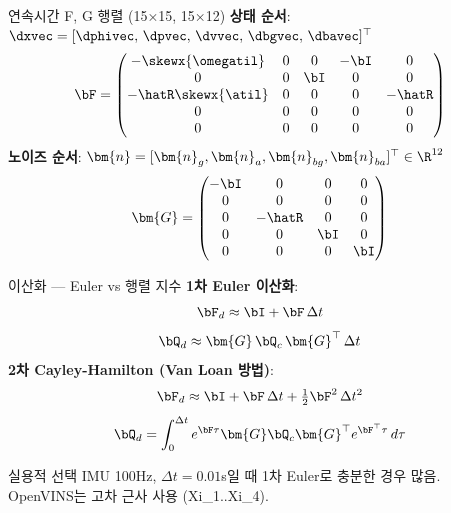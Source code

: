 \begin{frame}[shrink=5]{연속시간 F, G 행렬 (15×15, 15×12)}
  \textbf{상태 순서}: $\dxvec = [\dphivec,\,\dpvec,\,\dvvec,\,\dbgvec,\,\dbavec]^\top$
  \[
    \bF = \begin{pmatrix}
      -\skewx{\omegatil} & 0 & 0 & -\bI & 0 \\
       0                 & 0 & \bI & 0   & 0 \\
      -\hatR\skewx{\atil}& 0 & 0 &  0   & -\hatR \\
       0 & 0 & 0 & 0 & 0 \\
       0 & 0 & 0 & 0 & 0
    \end{pmatrix}
  \]
  \textbf{노이즈 순서}: $\bm{n} = [\bm{n}_g, \bm{n}_a, \bm{n}_{bg}, \bm{n}_{ba}]^\top \in \R^{12}$
  \[
    \bm{G} = \begin{pmatrix}
      -\bI & 0 & 0 & 0 \\
       0 & 0 & 0 & 0 \\
       0 & -\hatR & 0 & 0 \\
       0 & 0 & \bI & 0 \\
       0 & 0 & 0 & \bI
    \end{pmatrix}
  \]
\end{frame}

\begin{frame}{이산화 — Euler vs 행렬 지수}
  \textbf{1차 Euler 이산화}:
  \[
    \bF_d \approx \bI + \bF\,\Delta t
  \]
  \[
    \bQ_d \approx \bm{G}\,\bQ_c\,\bm{G}^\top\,\Delta t
  \]
  \pause
  \vspace{0.3em}
  \textbf{2차 Cayley-Hamilton (Van Loan 방법)}:
  \[
    \bF_d \approx \bI + \bF\,\Delta t + \tfrac{1}{2}\bF^2\,\Delta t^2
  \]
  \[
    \bQ_d = \int_0^{\Delta t} e^{\bF\tau}\bm{G}\bQ_c\bm{G}^\top e^{\bF^\top\tau}\,d\tau
  \]
  \pause
  \begin{block}{실용적 선택}
    IMU 100Hz, $\Delta t = 0.01$s일 때 1차 Euler로 충분한 경우 많음. \\
    OpenVINS는 고차 근사 사용 (Xi\_1..Xi\_4).
  \end{block}
\end{frame}

